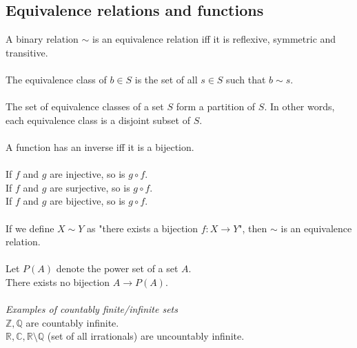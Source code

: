 \documentclass{scrartcl}
\newcommand{\R}{\mathbb{R}}
\newcommand{\Z}{\mathbb{Z}}
\newcommand{\Q}{\mathbb{Q}}
\newcommand{\C}{\mathbb{C}}
\begin{document}
\subsection{Equivalence relations and functions}
A binary relation $ \sim $ is an equivalence relation iff it is reflexive, symmetric and transitive.
\\\\
The equivalence class of $ b \in S $ is the set of all $ s \in S $ such that $ b \sim s $.
\\\\
The set of equivalence classes of a set $ S $ form a partition of $ S $. In other words, each equivalence class is a disjoint subset of $ S $.
\\\\
A function has an inverse iff it is a bijection.
\\\\
If $ f $ and $ g $ are injective, so is $ g \circ f $.
\\
If $ f $ and $ g $ are surjective, so is $ g \circ f $.
\\
If $ f $ and $ g $ are bijective, so is $ g \circ f $.
\\\\
If we define $ X \sim Y $ as "there exists a bijection $ f : X \to Y $", then $ \sim $ is an equivalence relation.
\\\\
Let $ P(A) $ denote the power set of a set $ A $.
\\
There exists no bijection $ A \to P(A) $.
\\\\
\textit{Examples of countably finite/infinite sets}
\\
$ \Z, \Q $ are countably infinite.
\\
$ \R, \C , \R \setminus \Q $ (set of all irrationals) are uncountably infinite.
\end{document}

